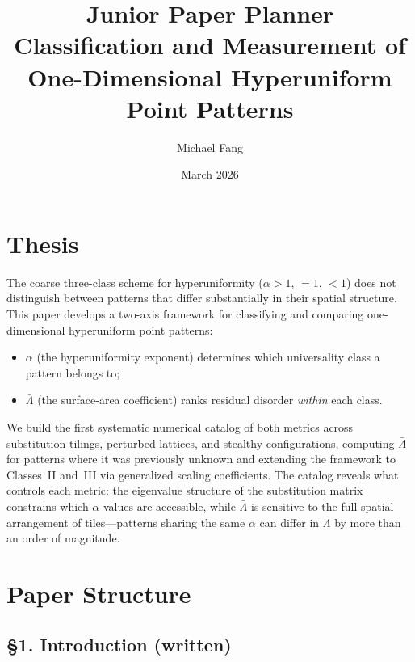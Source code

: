 \documentclass[11pt]{article}
\title{\textbf{Junior Paper Planner}\\[0.3em]
  \large Classification and Measurement of\\
  One-Dimensional Hyperuniform Point Patterns}
\author{Michael Fang}
\date{March 2026}
\newcommand{\Lb}{\bar\Lambda}
\begin{document}
\maketitle

\section{Thesis}

The coarse three-class scheme for hyperuniformity ($\alpha > 1$, $= 1$,
$< 1$) does not distinguish between patterns that differ substantially in
their spatial structure. This paper develops a two-axis framework for
classifying and comparing one-dimensional hyperuniform point patterns:
\begin{itemize}[noitemsep]
  \item $\alpha$ (the hyperuniformity exponent) determines which
        universality class a pattern belongs to;
  \item $\Lb$ (the surface-area coefficient) ranks residual disorder
        \emph{within} each class.
\end{itemize}
We build the first systematic numerical catalog of both metrics across
substitution tilings, perturbed lattices, and stealthy configurations,
computing $\Lb$ for patterns where it was previously unknown and extending
the framework to Classes~II and~III via generalized scaling coefficients.
The catalog reveals what controls each metric: the eigenvalue structure
of the substitution matrix constrains which $\alpha$ values are accessible,
while $\Lb$ is sensitive to the full spatial arrangement of tiles---patterns
sharing the same $\alpha$ can differ in $\Lb$ by more than an order of
magnitude.

\section{Paper Structure}

\subsection{\S1. Introduction \textnormal{\small (written)}}
\end{document}
